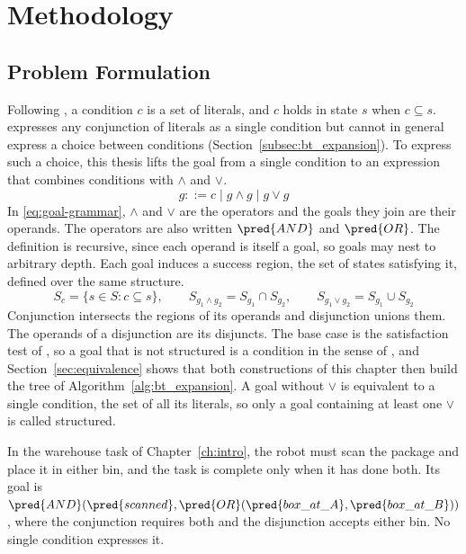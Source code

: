 \chapter{Methodology}
\label{ch:design}
\section{Problem Formulation}
\label{sec:problem_formulation}
    Following \cite{cai2021}, a condition $c$ is a set of literals, and $c$ holds in state $s$ when $c \subseteq s$.
    \probone expresses any conjunction of literals as a single condition but cannot in general express a choice between conditions (Section~\ref{subsec:bt_expansion}).
    To express such a choice, this thesis lifts the goal from a single condition to an expression that combines conditions with $\wedge$ and $\vee$.
    \begin{equation}
        g ::= c \mid g \wedge g \mid g \vee g
        \label{eq:goal-grammar}
    \end{equation}
    In \eqref{eq:goal-grammar}, $\wedge$ and $\vee$ are the operators and the goals they join are their operands.
    The operators are also written $\pred{AND}$ and $\pred{OR}$.
    The definition is recursive, since each operand is itself a goal, so goals may nest to arbitrary depth.
    Each goal induces a success region, the set of states satisfying it, defined over the same structure.
    \begin{equation}
        S_c = \{s \in S : c \subseteq s\}, \qquad
        S_{g_1 \wedge g_2} = S_{g_1} \cap S_{g_2}, \qquad
        S_{g_1 \vee g_2} = S_{g_1} \cup S_{g_2}
        \label{eq:success-region}
    \end{equation}
    Conjunction intersects the regions of its operands and disjunction unions them.
    The operands of a disjunction are its disjuncts.
    The base case is the satisfaction test of \probone, so a goal that is not structured is a condition in the sense of \probone, and Section~\ref{sec:equivalence} shows that both constructions of this chapter then build the tree of Algorithm~\ref{alg:bt_expansion}.
    A goal without $\vee$ is equivalent to a single condition, the set of all its literals, so only a goal containing at least one $\vee$ is called structured.

    In the warehouse task of Chapter~\ref{ch:intro}, the robot must scan the package and place it in either bin, and the task is complete only when it has done both.
    Its goal is $\pred{AND}(\pred{scanned}, \pred{OR}(\pred{box\_at\_A}, \pred{box\_at\_B}))$, where the conjunction requires both and the disjunction accepts either bin.
    No single condition expresses it.
    
